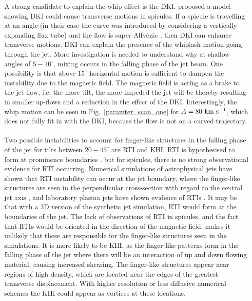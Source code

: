 \documentclass[12pt]{ociamthesis}
\newcommand{\Alfvenic}{Alfv\'{e}nic }
\newcommand{\kms}{~\rm{km ~s^{-1}}}
\newcommand{\np}{\\ \\}
\newcommand{\degs}{^{\circ}}
\begin{document}
A strong candidate to explain the whip effect is the DKI. \cite{Zaqarashvili2020ApJ893L46Z} proposed a model showing DKI could cause transverse motions in spicules. If a spicule is travelling at an angle (in their case the curve was introduced by considering a vertically expanding flux tube) and the flow is super-\Alfvenic, then DKI can enhance transverse motions. DKI can explain the presence of the whiplash motion going through the jet. More investigation is needed to understand why at shallow angles of $5-10\degs$, mixing occurs in the falling phase of the jet beam. One possibility is that above $15^{\circ}$ horizontal motion is sufficient to dampen the instability due to the magnetic field. The magnetic field is acting as a brake to the jet flow, i.e. the more tilt, the more impeded the jet will be thereby resulting in smaller up-flows and a reduction in the effect of the DKI. Interestingly, the whip motion can be seen in Fig.~\ref{paramter_scan_one} for $A=80 \kms$, which does not fully fit in with the DKI, because the flow is not on a curved trajectory. \np 
Two possible instabilities to account for finger-like structures in the falling phase of the jet for tilts between $20-45\degs$ are RTI and KHI. RTI is hypothesised to form at prominence boundaries \citep{Berger2008ApJ676L89B,Berger2010ApJ7161288B,Hillier2012ApJ746120H,Berger2017ApJ85060B}, but for spicules, there is no strong observational evidence for RTI occurring. Numerical simulations of astrophysical jets have shown that RTI instability can occur at the jet boundary, where the finger-like structures are seen in the perpendicular cross-section with regard to the central jet axis \citep{Toma2017MNRAS4721253T,Matsumoto2017MNRAS4721421M}, and laboratory plasma jets have shown evidence of RTIs \citep{Zhai2016PhPl23c2121Z}. It may be that with a 3D version of the synthetic jet simulation, RTI would form at the boundaries of the jet. The lack of observations of RTI in spicules, and the fact that RTIs would be oriented in the direction of the magnetic field, makes it unlikely that these are responsible for the finger-like structures seen in the simulations. It is more likely to be KHI, as the finger-like patterns form in the falling phase of the jet where there will be an interaction of up and down flowing material, causing increased shearing. The finger-like structures appear near regions of high density, which are located near the edges of the greatest transverse displacement. With higher resolution or less diffusive numerical schemes the KHI could appear as vortices at these locations. \np
\end{document}
